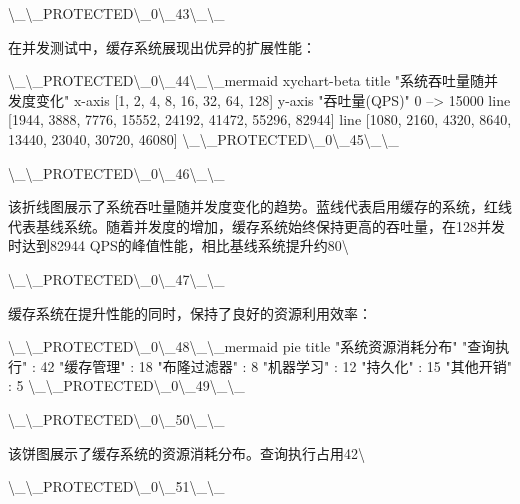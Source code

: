 \textbackslash{}_\textbackslash{}_PROTECTED\textbackslash{}_0\textbackslash{}_43\textbackslash{}_\textbackslash{}_

在并发测试中，缓存系统展现出优异的扩展性能：

\textbackslash{}_\textbackslash{}_PROTECTED\textbackslash{}_0\textbackslash{}_44\textbackslash{}_\textbackslash{}_mermaid
xychart-beta
    title "系统吞吐量随并发度变化"
    x-axis [1, 2, 4, 8, 16, 32, 64, 128]
    y-axis "吞吐量(QPS)" 0 --> 15000
    line [1944, 3888, 7776, 15552, 24192, 41472, 55296, 82944]
    line [1080, 2160, 4320, 8640, 13440, 23040, 30720, 46080]
\textbackslash{}_\textbackslash{}_PROTECTED\textbackslash{}_0\textbackslash{}_45\textbackslash{}_\textbackslash{}_

\textbackslash{}_\textbackslash{}_PROTECTED\textbackslash{}_0\textbackslash{}_46\textbackslash{}_\textbackslash{}_

该折线图展示了系统吞吐量随并发度变化的趋势。蓝线代表启用缓存的系统，红线代表基线系统。随着并发度的增加，缓存系统始终保持更高的吞吐量，在128并发时达到82944 QPS的峰值性能，相比基线系统提升约80\textbackslash{}%

\textbackslash{}_\textbackslash{}_PROTECTED\textbackslash{}_0\textbackslash{}_47\textbackslash{}_\textbackslash{}_

缓存系统在提升性能的同时，保持了良好的资源利用效率：

\textbackslash{}_\textbackslash{}_PROTECTED\textbackslash{}_0\textbackslash{}_48\textbackslash{}_\textbackslash{}_mermaid
pie title "系统资源消耗分布"
    "查询执行" : 42
    "缓存管理" : 18
    "布隆过滤器" : 8
    "机器学习" : 12
    "持久化" : 15
    "其他开销" : 5
\textbackslash{}_\textbackslash{}_PROTECTED\textbackslash{}_0\textbackslash{}_49\textbackslash{}_\textbackslash{}_

\textbackslash{}_\textbackslash{}_PROTECTED\textbackslash{}_0\textbackslash{}_50\textbackslash{}_\textbackslash{}_

该饼图展示了缓存系统的资源消耗分布。查询执行占用42\textbackslash{}%

\textbackslash{}_\textbackslash{}_PROTECTED\textbackslash{}_0\textbackslash{}_51\textbackslash{}_\textbackslash{}_

